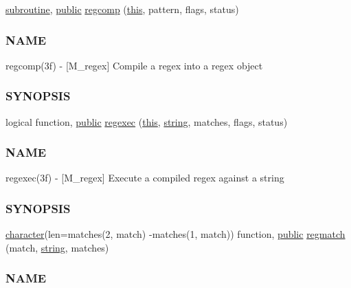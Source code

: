 \begin{DoxyCompactItemize}
\item 
\hyperlink{M__stopwatch_83_8txt_acfbcff50169d691ff02d4a123ed70482}{subroutine}, \hyperlink{M__stopwatch_83_8txt_a2f74811300c361e53b430611a7d1769f}{public} \hyperlink{namespacem__regex_ac4e468cb031565f4f4744d8f4c9eee91}{regcomp} (\hyperlink{M__stopwatch_83_8txt_ad62a52042bb610eee5b36b5516caec22}{this}, pattern, flags, status)
\begin{DoxyCompactList}\small\item\em \subsubsection*{N\+A\+ME}

regcomp(3f) -\/ \mbox{[}M\+\_\+regex\mbox{]} Compile a regex into a regex object \subsubsection*{S\+Y\+N\+O\+P\+S\+IS}\end{DoxyCompactList}\item 
logical function, \hyperlink{M__stopwatch_83_8txt_a2f74811300c361e53b430611a7d1769f}{public} \hyperlink{namespacem__regex_a44394d605b1a98fb246bc4622a08f878}{regexec} (\hyperlink{M__stopwatch_83_8txt_ad62a52042bb610eee5b36b5516caec22}{this}, \hyperlink{what__overview_81_8txt_a74cb7e955273b9f9157b4f0c18a38849}{string}, matches, flags, status)
\begin{DoxyCompactList}\small\item\em \subsubsection*{N\+A\+ME}

regexec(3f) -\/ \mbox{[}M\+\_\+regex\mbox{]} Execute a compiled regex against a string \subsubsection*{S\+Y\+N\+O\+P\+S\+IS}\end{DoxyCompactList}\item 
\hyperlink{option__stopwatch_83_8txt_abd4b21fbbd175834027b5224bfe97e66}{character}(len=matches(2, match) -\/matches(1, match)) function, \hyperlink{M__stopwatch_83_8txt_a2f74811300c361e53b430611a7d1769f}{public} \hyperlink{namespacem__regex_a87c92921c53d800b316b0772140a8373}{regmatch} (match, \hyperlink{what__overview_81_8txt_a74cb7e955273b9f9157b4f0c18a38849}{string}, matches)
\begin{DoxyCompactList}\small\item\em \subsubsection*{N\+A\+ME}


\end{DoxyCompactList}
\end{DoxyCompactItemize}
